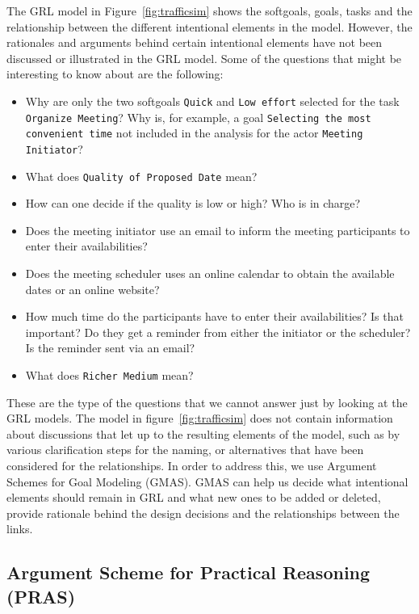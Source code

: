 The GRL model in Figure~\ref{fig:trafficsim} shows the softgoals, goals, tasks and the relationship between the different intentional elements in the model. However, the rationales and arguments behind certain intentional elements have not been discussed or illustrated in the GRL model. Some of the questions that might be interesting to know about are the following:

\begin{itemize}
	\item Why are only the two softgoals \texttt{Quick} and \texttt{Low effort} selected for the task  \texttt{Organize Meeting}? Why is, for example, a goal \texttt{Selecting the most convenient time} not included in the analysis for the actor \texttt{Meeting Initiator}?
	\item What does  \texttt{Quality of Proposed Date} mean?
	\item How can one decide if the quality is low or high? Who is in charge? %
	\item Does the meeting initiator use an email to inform the meeting participants to enter their availabilities? 
	\item Does the meeting scheduler uses an online calendar to obtain the available dates or an online website?
	\item How much time do the participants have to enter their availabilities? Is that important? Do they get a reminder from either the initiator or the scheduler? Is the reminder sent via an email? 
	\item What does \texttt{Richer Medium} mean? 
\end{itemize}

These are the type of the questions that we cannot answer just by looking at the GRL models. The model in figure~\ref{fig:trafficsim} does not contain information about discussions that let up to the resulting elements of the model, such as by various clarification steps for the naming, or alternatives that have been considered for the relationships. In order to address this, we use Argument Schemes for Goal Modeling (GMAS). GMAS can help us decide what intentional elements should remain in GRL and what new ones to be added or deleted, provide rationale behind the design decisions and the relationships between the links. 

\subsection{Argument Scheme for Practical Reasoning (PRAS)}
\label{sect:background:pras}


